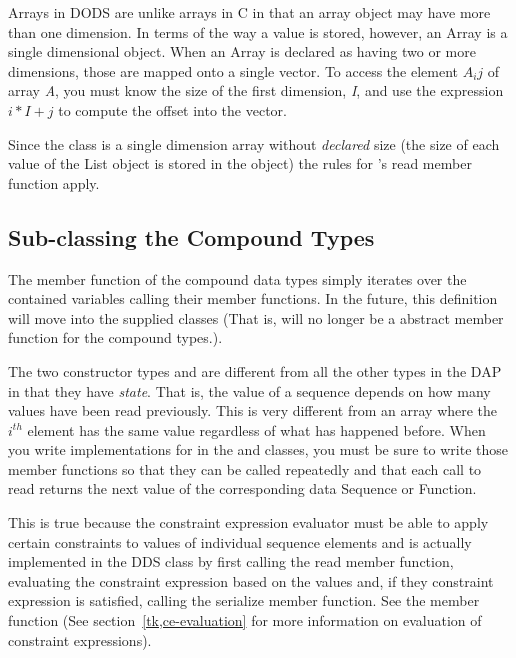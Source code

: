 Arrays in DODS are unlike arrays in C in that an array object may have
more than one dimension. In terms of the way a value is stored,
however, an Array is a single dimensional object. When an Array is
declared as having two or more dimensions, those are mapped onto a
single vector. To access the element $A_ij$ of array \emph{A}, you
must know the size of the first dimension, \emph{I}, and use the
expression $i * I + j$ to compute the offset into the vector.

Since the class  is a single dimension array without
\emph{declared} size (the size of each value of the List object is
stored in the object) the rules for 's read member
function apply.

\subsection{Sub-classing the Compound Types}

The  member function of the compound data types simply
iterates over the contained variables calling their  member
functions. In the future, this definition will move into the supplied
classes (That is,  will no longer be a abstract member
function for the compound types.).

The two constructor types  and  are
different from all the other types in the DAP in that they have
\emph{state}. That is, the value of a sequence depends on how many
values have been read previously.  This is very different from an
array where the $i^{th}$ element has the same value regardless of what
has happened before. When you write implementations for  in
the  and  classes, you must be sure to
write those member functions so that they can be called repeatedly and
that each call to read returns the next value of the corresponding
data Sequence or Function.

This is true because the constraint expression evaluator must be able to
apply certain constraints to values of individual sequence elements and is
actually implemented in the DDS class by first calling the read member
function, evaluating the constraint expression based on the values and, if
they constraint expression is satisfied, calling the serialize member
function.  See the member function  (See
section~\ref{tk,ce-evaluation} for more information on evaluation of
constraint expressions).

